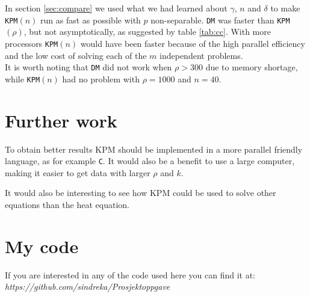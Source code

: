 In section \ref{sec:compare} we used what we had learned about $\gamma$, $n$ and $\delta$ to make \texttt{KPM}$(n)$ run as fast as possible with $p$ non-separable. \texttt{DM} was faster than \texttt{KPM}$(\rho)$, but not asymptotically, as suggested by table \ref{tab:cc}. With more processors \texttt{KPM}$(n)$ would have been faster because of the high parallel efficiency and the low cost of solving each of the $m$ independent problems. \\







It is worth noting that \texttt{DM} did not work when $\rho>300$ due to memory shortage, while \texttt{KPM}$(n)$ had no problem with $\rho = 1000$ and $n = 40$. \\

\chapter*{Further work}%
To obtain better results KPM should be implemented in a more parallel friendly language, as for example \texttt{C}. It would also be a benefit to use a large computer, making it easier to get data with larger $\rho$ and $k$.

It would also be interesting to see how KPM could be used to solve other equations than the heat equation.
\chapter*{My code}%

If you are interested in any of the code used here you can find it at: \\
\emph{https://github.com/sindreka/Prosjektoppgave}
